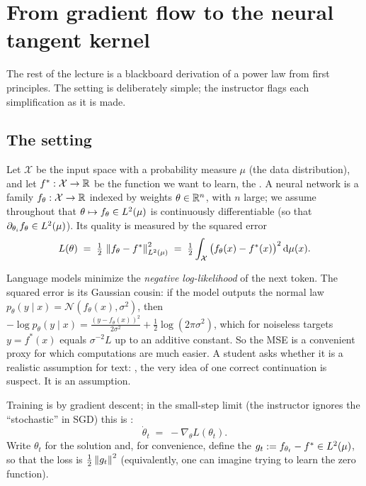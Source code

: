 
\section{From gradient flow to the neural tangent kernel}\label{sec:L2-ntk}
The rest of the lecture is a blackboard derivation of a power law from first principles. The setting is deliberately simple; the instructor flags each simplification as it is made.

\subsection{The setting}
Let $\mathcal X$ be the input space with a probability measure $\mu$ (the data distribution), and let $f^*:\mathcal X\to\mathbb{R}$ be the function we want to learn, the . A neural network is a family $f_\theta:\mathcal X\to\mathbb{R}$ indexed by weights $\theta\in\mathbb{R}^n$, with $n$ large; we assume throughout that $\theta\mapsto f_\theta\in L^2(\mu)$ is continuously differentiable (so that $\partial_{\theta_i}f_\theta\in L^2(\mu)$).
Its quality is measured by the squared error
\begin{equation}\label{eq:mse}
  L(\theta)\;=\;\tfrac12\,\left\lVert f_\theta-f^*\right\rVert^2_{L^2(\mu)}\;=\;\tfrac12\int_{\mathcal X}\big(f_\theta(x)-f^*(x)\big)^2\,\mathrm{d}\mu(x).
\end{equation}

\begin{remark}
Language models minimize the \emph{negative log-likelihood} of the next token. The squared error is its Gaussian cousin: if the model outputs the normal law $p_\theta(y\mid x)=\mathcal N(f_\theta(x),\sigma^2)$, then
$-\log p_\theta(y\mid x)=\frac{(y-f_\theta(x))^2}{2\sigma^2}+\frac12\log(2\pi\sigma^2)$, which for noiseless targets $y=f^*(x)$ equals $\sigma^{-2}L$ up to an additive constant. So the MSE is a convenient proxy for which computations are much easier.
A student asks whether it is a realistic assumption for text: , the very idea of one correct continuation is suspect. It is an assumption.
\end{remark}

Training is by gradient descent; in the small-step limit (the instructor ignores the ``stochastic'' in SGD) this is :
\begin{equation}\label{eq:flow}
  \dot\theta_t\;=\;-\nabla_\theta L(\theta_t).
\end{equation}
Write $\theta_t$ for the solution and, for convenience, define the  $g_t:=f_{\theta_t}-f^*\in L^2(\mu)$, so that the loss is $\frac12\left\lVert g_t\right\rVert^2$ (equivalently, one can imagine trying to learn the zero function).

